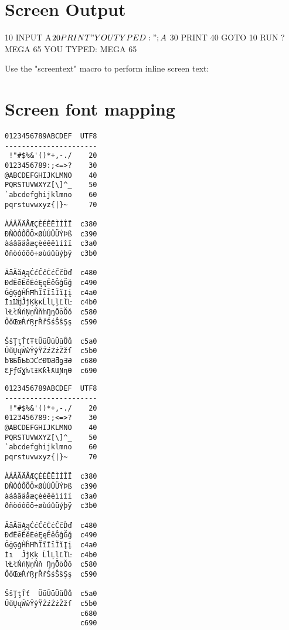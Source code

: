 \megakey{*} \megakey{$\leftarrow$} \megakey{$\uparrow$} \megakey{$\rightarrow$} \megakey{$\downarrow$}

\section{Screen Output}

\begin{screenoutput}
	10 INPUT A$
	20 PRINT "YOU TYPED: ";A$
	30 PRINT
	40 GOTO 10
	RUN
	? MEGA 65
	YOU TYPED: MEGA 65
\end{screenoutput}


Use the "screentext" macro to perform inline screen text:


\section{Screen font mapping}


\begin{minipage}{5cm}
\verbatimfont{\codefont}
\begin{verbatim}
0123456789ABCDEF  UTF8
----------------------
 !"#$%
0123456789:;<=>?    30
@ABCDEFGHIJKLMNO    40
PQRSTUVWXYZ[\]^_    50
`abcdefghijklmno    60
pqrstuvwxyz{|}~     70

ÀÁÂÃÄÅÆÇÈÉÊËÌÍÎÏ  c380
ÐÑÒÓÔÕÖ×ØÙÚÛÜÝÞß  c390
àáâãäåæçèéêëìíîï  c3a0
ðñòóôõö÷øùúûüýþÿ  c3b0

ĀāĂăĄąĆćĈĉĊċČčĎď  c480
ĐđĒēĔĕĖėĘęĚěĜĝĞğ  c490
ĠġĢģĤĥĦħĨĩĪīĬĭĮį  c4a0
İıĲĳĴĵĶķĸĹĺĻļĽľĿ  c4b0
ŀŁłŃńŅņŇňŉŊŋŌōŎŏ  c580
ŐőŒœŔŕŖŗŘřŚśŜŝŞş  c590

ŠšŢţŤťŦŧŨũŪūŬŭŮů  c5a0
ŰűŲųŴŵŶŷŸŹźŻżŽžſ  c5b0
ƀƁƂƃƄƅƆƇƈƉƊƋƌƍƎƏ  c680
ƐƑƒƓƔƕƖƗƘƙƚƛƜƝƞƟ  c690
\end{verbatim}
\end{minipage}
\begin{minipage}{5cm}
\verbatimfont{\ttfamily}
\begin{verbatim}
0123456789ABCDEF  UTF8
----------------------
 !"#$%&'()*+,-./    20
0123456789:;<=>?    30
@ABCDEFGHIJKLMNO    40
PQRSTUVWXYZ[\]^_    50
`abcdefghijklmno    60
pqrstuvwxyz{|}~     70

ÀÁÂÃÄÅÆÇÈÉÊËÌÍÎÏ  c380
ÐÑÒÓÔÕÖ×ØÙÚÛÜÝÞß  c390
àáâãäåæçèéêëìíîï  c3a0
ðñòóôõö÷øùúûüýþÿ  c3b0

ĀāĂăĄąĆćĈĉĊċČčĎď  c480
ĐđĒēĔĕĖėĘęĚěĜĝĞğ  c490
ĠġĢģĤĥĦħĨĩĪīĬĭĮį  c4a0
İı  ĴĵĶķ ĹĺĻļĽľĿ  c4b0
ŀŁłŃńŅņŇň ŊŋŌōŎŏ  c580
ŐőŒœŔŕŖŗŘřŚśŜŝŞş  c590

ŠšŢţŤť  ŨũŪūŬŭŮů  c5a0
ŰűŲųŴŵŶŷŸŹźŻżŽžſ  c5b0
                  c680
                  c690
\end{verbatim}
\end{minipage}

